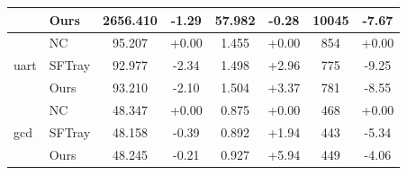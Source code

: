 \begin{table}[t]
{\begin{tabular}{llcccccc}
 & Ours & 2656.410 & -1.29 & 57.982 & -0.28 & 10045 & -7.67 \\
\midrule
\multirow{3}{*}{uart} & NC & 95.207 & +0.00 & 1.455 & +0.00 & 854 & +0.00 \\
 & SFTray & 92.977 & -2.34 & 1.498 & +2.96 & 775 & -9.25 \\
 & Ours & 93.210 & -2.10 & 1.504 & +3.37 & 781 & -8.55 \\
\midrule
\multirow{3}{*}{gcd} & NC & 48.347 & +0.00 & 0.875 & +0.00 & 468 & +0.00 \\
 & SFTray & 48.158 & -0.39 & 0.892 & +1.94 & 443 & -5.34 \\
 & Ours & 48.245 & -0.21 & 0.927 & +5.94 & 449 & -4.06 \\
\midrule
\bottomrule
\end{tabular}
}
\end{table}